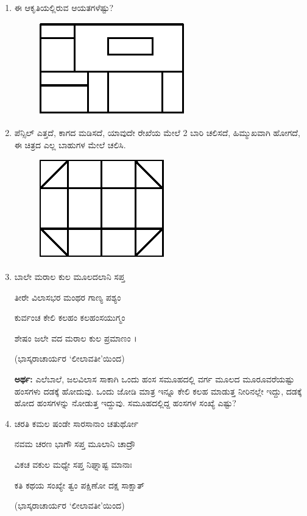 \begin{enumerate}
\item ಈ ಆಕೃತಿಯಲ್ಲಿರುವ ಆಯತಗಳೆಷ್ಟು? 
\begin{figure}[H]
\centering
\includegraphics{images/chap6/q15.eps}
\end{figure}

\item ಪೆನ್ಸಿಲ್ ಎತ್ತದೆ, ಕಾಗದ ಮಡಿಸದೆ, ಯಾವುದೇ ರೇಖೆಯ ಮೇಲೆ 2 ಬಾರಿ ಚಲಿಸದೆ, ಹಿಮ್ಮುಖವಾಗಿ ಹೋಗದೆ, ಈ ಚಿತ್ರದ ಎಲ್ಲ ಬಾಹುಗಳ ಮೇಲೆ ಚಲಿಸಿ. 
\begin{figure}[H]
\centering
\includegraphics{images/chap6/q16.eps}
\end{figure}

\item ಬಾಲೇ ಮರಾಲ ಕುಲ ಮೂಲದಲಾನಿ ಸಪ್ತ 

ತೀರೇ ವಿಲಾಸಭರ ಮಂಥರ ಗಾಣ್ಯ ಪಶ್ಯಂ 

ಕುರ್ವಂಚ ಕೇಲಿ ಕಲಹಂ ಕಲಹಂಸಯುಗ್ಮಂ 

ಶೇಷಂ ಜಲೇ ವದ ಮರಾಲ ಕುಲ ಪ್ರಮಾಣಂ ।

\smallskip
\hfill (ಭಾಸ್ಕರಾಚಾರ್ಯರ `ಲೀಲಾವತೀ'ಯಿಂದ)

\smallskip
{\bf ಅರ್ಥ:} ಎಲೆಬಾಲೆ, ಜಲವಿಲಾಸ ಸಾಕಾಗಿ ಒಂದು ಹಂಸ ಸಮೂಹದಲ್ಲಿ ವರ್ಗ ಮೂಲದ ಮೂರೂವರೆಯಷ್ಟು ಹಂಸಗಳು ದಡಕ್ಕೆ ಹೋದುವು. ಒಂದು ಜೋಡಿ ಮಾತ್ರ ಇನ್ನೂ ಕೇಲಿ ಕಲಹ ಮಾಡುತ್ತ ನೀರಿನಲ್ಲೇ ಇದ್ದು, ದಡಕ್ಕೆ ಹೋದ ಹಂಸಗಳನ್ನು ನೋಡುತ್ತ ಇದ್ದುವು. ಸಮೂಹದಲ್ಲಿದ್ದ ಹಂಸಗಳ ಸಂಖ್ಯೆ ಎಷ್ಟು? 

\item ಚರತಿ ಕಮಲ ಷಂಡೇ ಸಾರಸಾನಾಂ ಚತುರ್ಥೋ 

ನವಮ ಚರಣ ಭಾಗೌ ಸಪ್ತ ಮೂಲಾನಿ ಚಾದ್ರೌ 

ವಿಕಚ ವಕುಲ ಮಧ್ಯೇ ಸಪ್ತ ನಿಘ್ನಾಷ್ಟ ಮಾನಾಃ 

ಕತಿ ಕಥಯ ಸಂಖ್ಯೇ ತ್ವಂ ಪಕ್ಷಿಣೋ ದಕ್ಷ ಸಾಕ್ಷಾತ್ 

\smallskip
\hfill (ಭಾಸ್ಕರಾಚಾರ್ಯರ `ಲೀಲಾವತೀ'ಯಿಂದ)


\end{enumerate}
